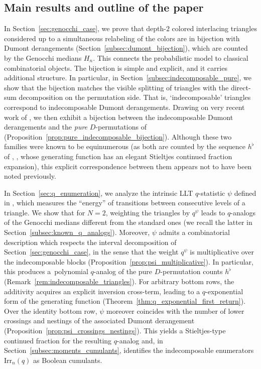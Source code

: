 \documentclass[10pt,a4paper]{amsart}
\numberwithin{equation}{section}
\theoremstyle{definition}
\begin{document}
\subsection{Main results and outline of the paper}
\label{subsec:main_results}

In Section~\ref{sec:genocchi_case}, we prove that depth-$2$ colored interlacing triangles considered up to a simultaneous relabeling of the colors are in bijection with Dumont derangements (Section~\ref{subsec:dumont_bijection}), which are counted by the Genocchi medians $H_n$.  This connects the probabilistic model to classical combinatorial objects.  The bijection is simple and explicit, and it carries additional structure. In particular, in Section~\ref{subsec:indecomposable_pure}, we show that the bijection matches the visible splitting of triangles with the direct-sum decomposition on the permutation side. That is, `indecomposable' triangles correspond to indecomposable Dumont derangements.  Drawing on very recent work of \cite{PoddarSawantShankar2026}, we then exhibit a bijection between the indecomposable Dumont derangements and the \emph{pure} $D$-permutations of \cite{DebSokal2024} (Proposition~\ref{prop:pure_indecomposable_bijection}).  Although these two families were known to be equinumerous (as both are counted by the sequence $h^\flat$ of \cite{DebSokal2024}, \cite[A362111]{OEIS}, whose generating function has an elegant Stieltjes continued fraction expansion), this explicit correspondence between them appears not to have been noted previously.

In Section~\ref{sec:q_enumeration}, we analyze the intrinsic LLT $q$-statistic $\psi$ defined in \cite{ABW2023coloured_LLT}, which measures the ``energy'' of transitions between consecutive levels of a triangle.  We show that for $N=2$, weighting the triangles by $q^{\psi}$ leads to $q$-analogs of the Genocchi medians different from the standard ones (we recall the latter in Section~\ref{subsec:known_q_analogs}).  Moreover, $\psi$ admits a combinatorial description which respects the interval decomposition of Section~\ref{sec:genocchi_case}, in the sense that the weight $q^{\psi}$ is multiplicative over the indecomposable blocks (Proposition~\ref{prop:psi_multiplicative}).  In particular, this produces a~polynomial $q$-analog of the pure $D$-permutation counts $h^\flat$ (Remark~\ref{rem:indecomposable_triangles}).  For arbitrary bottom rows, the additivity acquires an explicit inversion cross-term, leading to a $q$-exponential form of the generating function (Theorem~\ref{thm:q_exponential_first_return}).  Over the identity bottom row, $\psi$ moreover coincides with the number of lower crossings and nestings of the associated Dumont derangement (Proposition~\ref{prop:psi_crossings_nestings}).  This yields a Stieltjes-type continued fraction for the resulting $q$-analog and, in Section~\ref{subsec:moments_cumulants}, identifies the indecomposable enumerators $\mathrm{Irr}_n(q)$ as Boolean cumulants.
\end{document}
